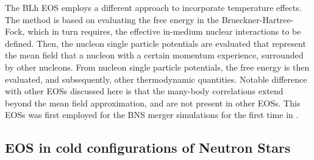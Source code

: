 The BLh \ac{EOS} employs a different approach to incorporate temperature effects.
The method is based on evaluating the free energy in the Brueckner-Hartree-Fock, which in turn requires,
the effective in-medium nuclear interactions to be defined.
%
Then, the nucleon single particle potentials are evaluated %
that represent the mean field that a nucleon with a certain momentum experience, surrounded by other nucleons.
From nucleon single particle potentials, the free energy is then evaluated, and subsequently, 
other thermodynamic quantities. Notable difference with other \acp{EOS} discussed here is that the many-body 
correlations extend beyond the mean field approximation, and are not present in other \acp{EOS}. 
This \acp{EOS} was first employed for the \ac{BNS} merger simulations for the first time in \citet{Bernuzzi:2020txg}.



\subsection{\ac{EOS} in cold configurations of Neutron Stars}


